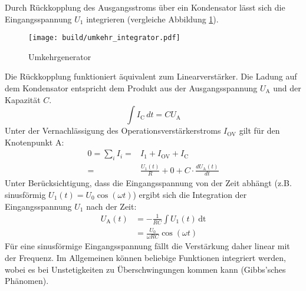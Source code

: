 Durch Rückkopplung des Ausgangsstroms über ein Kondensator lässt sich die
Eingangsspannung $U_1$ integrieren (vergleiche Abbildung \ref{fig:integrator}).
\begin{figure}[h]
		\centering
		\texttt{[image: build/umkehr\_integrator.pdf]}
		\caption{Umkehrgenerator \cite{anleitung}}
		\label{fig:integrator}
\end{figure}
Die Rückkopplung funktioniert äquivalent zum Linearverstärker.
Die Ladung auf dem Kondensator entspricht dem Produkt aus der Ausgangsspannung
$U_\text{A}$ und der Kapazität $C$.
\begin{equation}
		\int I_\text{C} \, dt = C U_\text{A}
\end{equation}
Unter der Vernachlässigung des Operationsverstärkerstroms $I_\text{OV}$ gilt
für den Knotenpunkt A:
\begin{align}
		0 = \sum_i I_i =& I_1 + I_\text{OV} + I_\text{C} \nonumber \\
		=& \frac{U_1(t)}{R} + 0 + C \cdot \frac{d U_\text{A}(t)}{dt}
\end{align}
Unter Berücksichtigung, dass die Eingangsspannung von der Zeit abhängt (z.B.
sinusförmig $U_1(t)= U_0 \cos(\omega t)$) ergibt sich die Integration der Eingangsspannung $U_1$ nach der Zeit:
\begin{align}
		U_\text{A}(t) &= - \frac{1}{RC} \int U_\text{1}(t) \, \text{dt} \nonumber \\
                  &= \frac{U_0}{\omega R C} \cos (\omega t) \label{eq:integrator}
\end{align}
Für eine sinusförmige Eingangsspannung fällt die Verstärkung daher linear mit
der Frequenz.
Im Allgemeinen können beliebige Funktionen integriert werden, wobei es bei
Unstetigkeiten zu Überschwingungen kommen kann (Gibbs'sches Phänomen).


